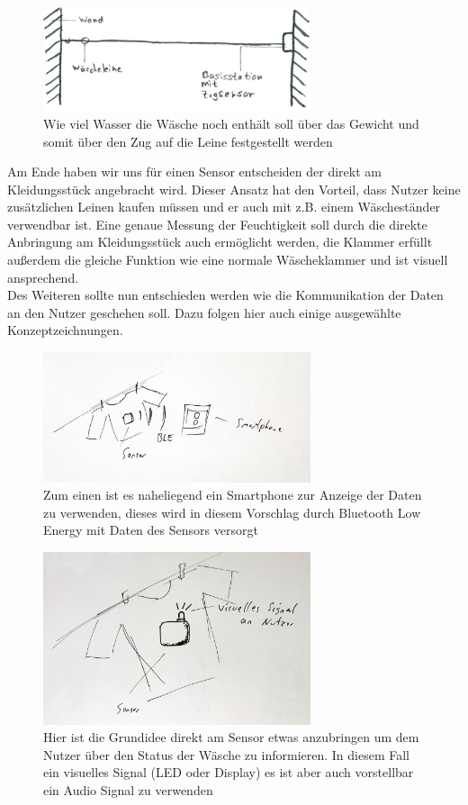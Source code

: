 \begin{figure}[htb] 
	\centerline{\includegraphics*[width=0.7\textwidth]{./10+10/Concept/07-zug}}
	\caption{Wie viel Wasser die Wäsche noch enthält soll über das Gewicht und somit über den Zug auf die Leine festgestellt werden}
	\label{10+10_zug}
\end{figure}
\FloatBarrier
Am Ende haben wir uns für einen Sensor entscheiden der direkt am Kleidungsstück angebracht wird. Dieser Ansatz hat den Vorteil, dass Nutzer keine zusätzlichen Leinen kaufen müssen und er auch mit z.B. einem Wäscheständer verwendbar ist. Eine genaue Messung der Feuchtigkeit soll durch die direkte Anbringung am Kleidungsstück auch ermöglicht werden, die Klammer erfüllt außerdem die gleiche Funktion wie eine normale Wäscheklammer und ist visuell ansprechend.
\\ Des Weiteren sollte nun entschieden werden wie die Kommunikation der Daten an den Nutzer geschehen soll. Dazu folgen hier auch einige ausgewählte Konzeptzeichnungen.
\begin{figure}[htb] 
	\centerline{\includegraphics*[width=0.7\textwidth]{./10+10/Detail/02_ble_app}}
	\caption{Zum einen ist es naheliegend ein Smartphone zur Anzeige der Daten zu verwenden, dieses wird in diesem Vorschlag durch Bluetooth Low Energy mit Daten des Sensors versorgt}
	\label{10+10_ble_app}
\end{figure}
\begin{figure}[htb] 
	\centerline{\includegraphics*[width=0.7\textwidth]{./10+10/Detail/03_visual_signal}}
	\caption{Hier ist die Grundidee direkt am Sensor etwas anzubringen um dem Nutzer über den Status der Wäsche zu informieren. In diesem Fall ein visuelles Signal (LED oder Display) es ist aber auch vorstellbar ein Audio Signal zu verwenden}
	\label{10+10_visual_signal}
\end{figure}
